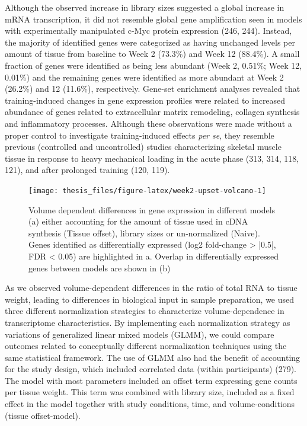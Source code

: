\documentclass[twoside,10pt]{gihclass} %
\begin{document}
Although the observed increase in library sizes suggested a global increase in mRNA transcription, it did not resemble global gene amplification seen in models with experimentally manipulated c-Myc protein expression
(246, 244).
Instead, the majority of identified genes were categorized as having unchanged levels per amount of tissue from baseline to Week 2 (73.3\%) and Week 12 (88.4\%). A small fraction of genes were identified as being less abundant (Week 2, 0.51\%; Week 12, 0.01\%) and the remaining genes were identified as more abundant at Week 2 (26.2\%) and 12 (11.6\%), respectively.
Gene-set enrichment analyses revealed that training-induced changes in gene expression profiles were related to increased abundance of genes related to extracellular matrix remodeling, collagen synthesis and inflammatory processes. Although these observations were made without a proper control to investigate training-induced effects \emph{per se}, they resemble previous (controlled and uncontrolled) studies characterizing skeletal muscle tissue in response to heavy mechanical loading in the acute phase
(313, 314, 118, 121),
and after prolonged training (120, 119).
\begin{figure}

{\centering \texttt{[image: thesis\_files/figure-latex/week2-upset-volcano-1]} 

}

\caption[General patterns of differentially expressed genes at Week 2]{Volume dependent differences in gene expression in different models (a) either accounting for the amount of tissue used in cDNA synthesis (Tissue offset), library sizes or un-normalized (Naive). Genes identified as differentially expressed (log2 fold-change > |0.5|, FDR < 0.05) are highlighted in a.  Overlap in differentially expressed genes between models are shown in (b)}\label{fig:week2-upset-volcano}
\end{figure}
As we observed volume-dependent differences in the ratio of total RNA to tissue weight, leading to differences in biological input in sample preparation, we used three different normalization strategies to characterize volume-dependence in transcriptome characteristics.
By implementing each normalization strategy as variations of generalized linear mixed models (GLMM), we could compare outcomes related to conceptually different normalization techniques using the same statistical framework.
The use of GLMM also had the benefit of accounting for the study design, which included correlated data (within participants)
(279).
The model with most parameters included an offset term expressing gene counts per tissue weight. This term was combined with library size, included as a fixed effect in the model together with study conditions, time, and volume-conditions (tissue offset-model).
\end{document}
